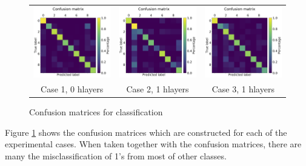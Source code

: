 \documentclass[letterpaper, 10 pt, conference]{ieeeconf}  %
\begin{document}
\begin{figure}[tbh]
    \centering
    \begin{centering}
    \begin{tabular}{ccc}
        \includegraphics[width=0.30\linewidth, trim=0cm 0cm 0cm 1.5cm, clip=true]{mnist_confusion_matrix_rate_based_case_1_rate_pynn8_3xx_20200131}&
        \includegraphics[width=0.30\linewidth, trim=0cm 0cm 0cm 1.5cm, clip=true]{mnist_confusion_matrix_rate_based_case_2_rate_pynn8_1dlayers_3x_20200217}&
        \includegraphics[width=0.30\linewidth, trim=0cm 0cm 0cm 1.5cm, clip=true]{mnist_confusion_matrix_rate_based_case_3_rate_pynn8_1dlayers_2x_20200217}\\
        Case 1, 0 hlayers & Case 2, 1 hlayers & Case 3, 1 hlayers
        \end{tabular}
     \end{centering}
     \caption{Confusion matrices for classification}
     \label{fig:confmat}
    \vspace{-10pt}
\end{figure}

Figure \ref{fig:confmat} shows the confusion matrices which are constructed for each of the experimental cases.
When taken together with the confusion matrices, there are many the misclassification of 1's from most of other classes.

\end{document}
